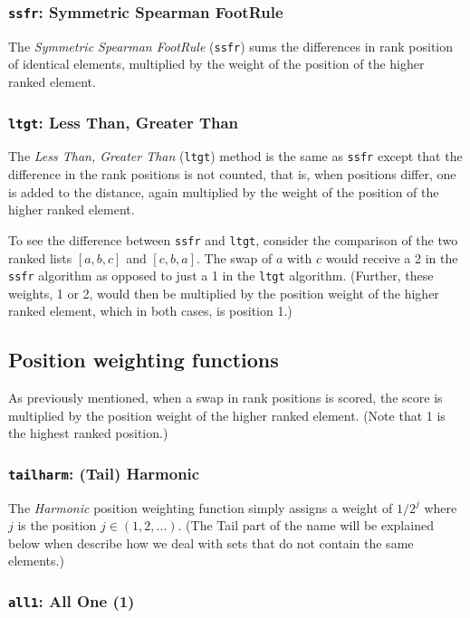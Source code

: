 \documentclass{article}
\begin{document}
\subsubsection{\texttt{ssfr}: Symmetric Spearman FootRule}

The \emph{Symmetric Spearman FootRule} (\texttt{ssfr}) sums the differences in rank position of identical elements, multiplied by the weight of the position of the higher ranked element. 

\subsubsection{\texttt{ltgt}: Less Than, Greater Than}

The \emph{Less Than, Greater Than} (\texttt{ltgt}) method is the same as \texttt{ssfr} except that the difference in the rank positions is not counted, that is, when positions differ, one is added to the distance, again multiplied by the weight of the position of the higher ranked element. 

To see the difference between \texttt{ssfr} and \texttt{ltgt}, consider the comparison of the two ranked lists $[a,b,c]$ and $[c,b,a]$. The swap of $a$ with $c$ would receive a 2 in the \texttt{ssfr} algorithm as opposed to just a 1 in the \texttt{ltgt} algorithm. (Further, these weights, 1 or 2, would then be multiplied by the position weight of the higher ranked element, which in both cases, is position 1.)

\subsection{Position weighting functions}

As previously mentioned, when a swap in rank positions is scored, the score is multiplied by the position weight of the higher ranked element. (Note that 1 is the highest ranked position.) 

\subsubsection{\texttt{tailharm}: (Tail) Harmonic}

The \emph{Harmonic} position weighting function simply assigns a weight of $1/{2^j}$ where $j$ is the position $j\in (1, 2, ...)$. (The Tail part of the name will be explained below when describe how we deal with sets that do not contain the same elements.)

\subsubsection{\texttt{all1}: All One (1)}
\end{document}
